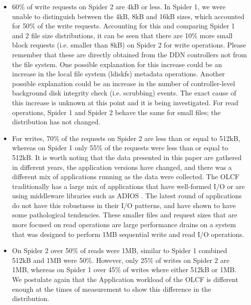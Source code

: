 \begin{itemize}

\item  60\% of write requests on Spider 2 are 4kB or less.  In Spider 1, we were
unable to distinguish between the 4kB, 8kB and 16kB sizes, which accounted for 50\%
of the write requests. Accounting for this and comparing Spider 1 and 2 file
size distributions, it can be seen that there are 10\% more small block
requests (i.e.  smaller than 8kB) on Spider 2 for write operations. Please
remember that these are directly obtained from the DDN controllers not from the
file system. One possible explanation for this increase could be an increase in the local
file system (ldiskfs) metadata operations. Another possible explanation could be an
increase in the number of controller-level background disk integrity check 
(i.e. scrubbing) events.
The exact cause of this increase is unknown at this point and it is being
investigated.  For read operations, Spider 1 and Spider 2 behave the same for
small files; the distribution has not changed.

\item  For writes, 70\% of the requests on Spider 2 are less than or
equal to 512kB, whereas on Spider 1 only 55\% of the requests were less than
or equal to 512kB. It is worth noting that the data presented in this paper are
 gathered in
different years, the application versions have changed, and there was a
different mix of applications running as the data were collected. The OLCF
traditionally has a large mix of applications that have well-formed I/O or are
using middleware libraries such as ADIOS \cite{adios}. The latest round of
applications do not have this robustness in their I/O patterns, and have shown
to have some pathological tendencies. These smaller files and request sizes
that are more focused on read operations are large performance drains on a
system that was designed to perform 1MB sequential write and read I/O
operations. 

\item On Spider 2 over 50\% of reads were 1MB, similar to Spider 1 combined
512kB and 1MB were 50\%. However, only 25\% of writes on Spider 2 are 1MB,
whereas on Spider 1 over 45\% of writes where either 512kB or 1MB. We postulate
again that the Application workload of the OLCF is different enough at the
times of measurement to show this difference in the distribution.


\end{itemize}
